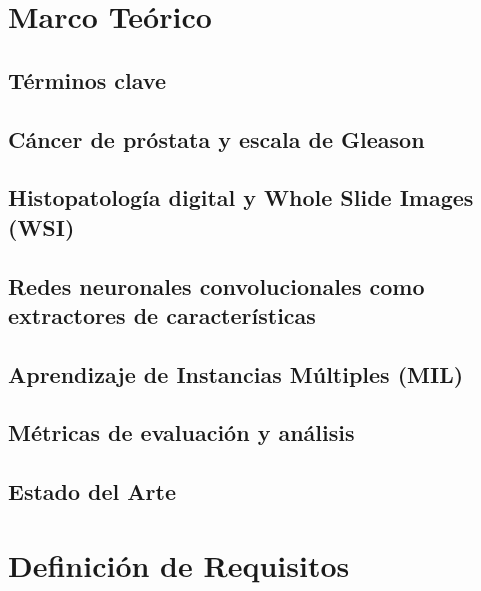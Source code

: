 \documentclass{thesis-tg-ie-pujc} %
\begin{document}
\chapter{Marco Teórico}
\section{Términos clave}


\section{Cáncer de próstata y escala de Gleason}


\section{Histopatología digital y Whole Slide Images (WSI)}


\section{Redes neuronales convolucionales como extractores de características}


\section{Aprendizaje de Instancias Múltiples (MIL)}


\section{Métricas de evaluación y análisis}


\section{Estado del Arte}


\chapter{Definición de Requisitos}

\end{document}
